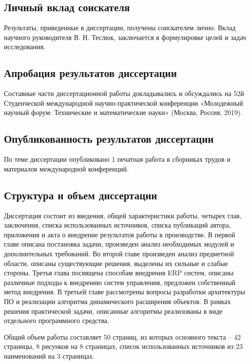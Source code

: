 \subsection*{Личный вклад соискателя}

Результаты, приведенные в диссертации, получены  соискателем лично.
Вклад научного руководителя В. Н. Теслюк, заключается в формулировке целей и задач исследования.

\subsection*{Апробация результатов диссертации}

Составные части диссертационной работы докладывались и обсуждались
на 52й Студенческой международной научно-практической конференции
«Молодежный научный форум: Технические и математические науки» (Москва, Россия, 2019).

\subsection*{Опубликованность результатов диссертации}

По теме диссертации опубликовано 1 печатная работа в сборниках трудов и материалов
международной конференций.


\subsection*{Структура и объем диссертации}

Диссертация состоит из введения, общей характеристики работы, четырех глав, заключения,
списка использованных источников, списка публикаций автора, приложения и акта о внедрение результатов
работы в производстве. В первой главе описана постановка задачи, произведен анализ необходимых
модулей и дополнительных требований. Во второй главе произведен анализ предметной области,
описаны существующие решения, выделены их сильные и слабые стороны.
Третья глава посвящена способам внедрения ERP систем, описаны различные подходы к внедрению
систем управления, предложен собственный метод внедрения.
В третьей главе рассмотрены вопросы разработки архитектуры ПО и реализации алгоритма
динамического расширения объектов.
В рамках решения практической задачи, описанные алгоритмы реализованы в виде отдельного
программного средства.

Общий объем работы составляет 50 страниц, из которых основного текста – 42 страницы,
8 рисунков на 8 страницах, список использованных источников из 23 наименований на 3 страницах.
